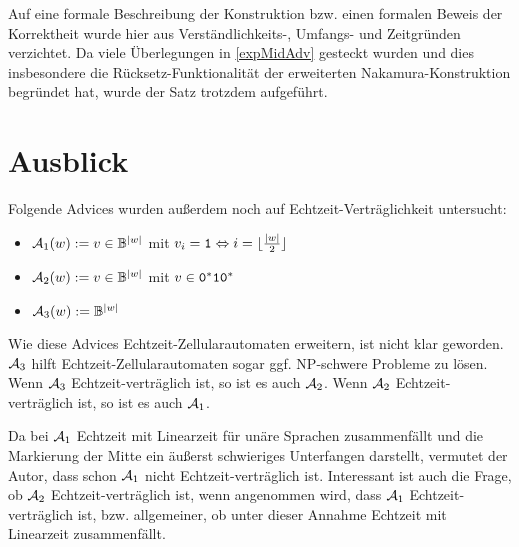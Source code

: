 Auf eine formale Beschreibung der Konstruktion \acs{bzw.} einen formalen Beweis der Korrektheit wurde
hier aus Verständlichkeits-, Umfangs- und Zeitgründen verzichtet. Da viele Überlegungen in \cref{expMidAdv} gesteckt wurden
und dies insbesondere die Rücksetz-Funktionalität der erweiterten Nakamura-Konstruktion begründet hat,
wurde der Satz trotzdem aufgeführt.

\section{Ausblick}

Folgende Advices wurden außerdem noch auf Echtzeit-Verträglichkeit untersucht:
\begin{itemize}
    \item $\mathcal{A}_1(w) := v \in \mathbb{B}^{|w|}$ mit $v_i = \texttt{1} \Leftrightarrow i = \lfloor \frac{|w|}{2} \rfloor$
    \item $\mathcal{A}_2(w) := v \in \mathbb{B}^{|w|}$ mit $v \in \texttt{0}^*\texttt{1}\texttt{0}^*$
    \item $\mathcal{A}_3(w) := \mathbb{B}^{|w|}$
\end{itemize}
Wie diese Advices Echtzeit-Zellularautomaten erweitern, ist nicht klar geworden.
$\mathcal{A}_3$ hilft Echtzeit-Zellularautomaten sogar \acs{ggf.} NP-schwere Probleme zu lösen.
Wenn $\mathcal{A}_3$ Echtzeit-verträglich ist, so ist es auch $\mathcal{A}_2$.
Wenn $\mathcal{A}_2$ Echtzeit-verträglich ist, so ist es auch $\mathcal{A}_1$.

Da bei $\mathcal{A}_1$ Echtzeit mit Linearzeit für unäre Sprachen zusammenfällt und die Markierung
der Mitte ein äußerst schwieriges Unterfangen darstellt, vermutet der Autor, dass schon $\mathcal{A}_1$ nicht
Echtzeit-verträglich ist.
Interessant ist auch die Frage, ob $\mathcal{A}_2$ Echtzeit-verträglich ist, wenn angenommen wird,
dass $\mathcal{A}_1$ Echtzeit-verträglich ist, \acs{bzw.} allgemeiner, ob unter dieser Annahme
Echtzeit mit Linearzeit zusammenfällt.